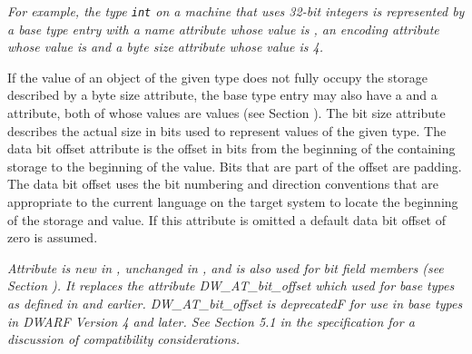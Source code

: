 \textit{For example, the 
 type \texttt{int} on a machine that uses 32-bit
integers is represented by a base type entry with a name
attribute whose value is , an encoding attribute
whose value is \DWATEsigned{}
and a byte size attribute whose value is 4.}

If the value of an object of the given type does not fully
occupy the storage described by a byte size attribute,
\hypertarget{chap:DWATdatabitoffsetbasetypebitlocation}{}
the base type entry may also have 
a 
\DWATbitsize{} and a
\DWATdatabitoffset{} attribute, 
both 
of whose values are
 values
(see Section ). 
The bit size
attribute describes the actual size in bits used to represent
values of the given type. The data bit offset attribute is the
offset in bits from the beginning of the containing storage to
the beginning of the value. Bits that are part of the offset
are padding. The data bit offset uses the bit numbering and
direction conventions that are appropriate to the current
language on the
target system to locate the beginning of the storage and
value. If this attribute is omitted a default data bit offset
of zero is assumed.

\textit{Attribute 
\DWATdatabitoffset{} 
is
new 
in 
\DWARFVersionIV{}, unchanged in \DWARFVersionV{}, and
is also used for bit field members 
(see Section ). 
It replaces the attribute DW\_AT\_bit\_offset
which used for base
types as defined in \DWARFVersionIII{} and earlier.
DW\_AT\_bit\_offset is deprecatedF
for use in base types in DWARF Version 4 and later.
See Section 5.1 in the \DWARFVersionIV{}
specification for a discussion of compatibility considerations.}

